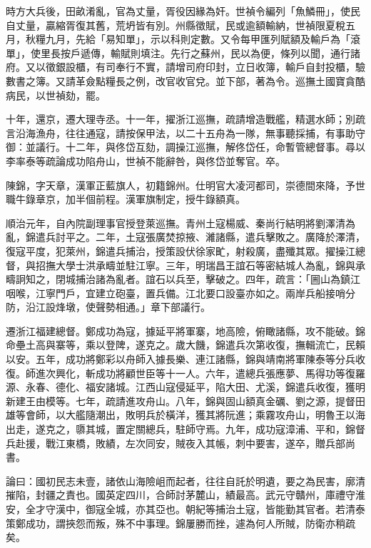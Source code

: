 \begin{pinyinscope}
時方大兵後，田畝淆亂，官為丈量，胥役因緣為奸。世禎令編列「魚鱗冊」，使民自丈量，贏縮胥復其舊，荒坍皆有別。州縣徵賦，民或逾額輸納，世禎限夏稅五月，秋糧九月，先給「易知單」，示以科則定數。又令每甲匯列賦額及輸戶為「滾單」，使里長按戶遞傳，輸賦則填注。先行之蘇州，民以為便，條列以聞，通行諸府。又以徵銀設櫃，有司奉行不實，請增司府印封，立日收簿，輸戶自封投櫃，驗數書之簿。又請革僉點糧長之例，改官收官兌。並下部，著為令。巡撫土國寶貪酷病民，以世禎劾，罷。

十年，還京，遷大理寺丞。十一年，擢浙江巡撫，疏請增造戰艦，精選水師；別疏言沿海漁舟，往往通寇，請按保甲法，以二十五舟為一隊，無事聽採捕，有事助守御：並議行。十二年，與佟岱互劾，調操江巡撫，解佟岱任，命暫管總督事。尋以李率泰等疏論成功陷舟山，世禎不能辭咎，與佟岱並奪官。卒。

陳錦，字天章，漢軍正藍旗人，初籍錦州。仕明官大凌河都司，崇德間來降，予世職牛錄章京，加半個前程。漢軍旗制定，授牛錄額真。

順治元年，自內院副理事官授登萊巡撫。青州土寇楊威、秦尚行結明將劉澤清為亂，錦遣兵討平之。二年，土寇張廣焚掠掖、濰諸縣，遣兵擊敗之。廣降於澤清，復寇平度，犯萊州，錦遣兵捕治，授策設伏徐家甿，射殺廣，盡殲其眾。擢操江總督，與招撫大學士洪承疇並駐江寧。三年，明瑞昌王誼石等密結城人為亂，錦與承疇詗知之，閉城捕治諸為亂者。誼石以兵至，擊破之。四年，疏言：「圌山為鎮江咽喉，江寧門戶，宜建立砲臺，置兵備。江北要口設臺亦如之。兩岸兵船接哨分防，沿江設烽墩，使聲勢相通。」章下部議行。

遷浙江福建總督。鄭成功為寇，據延平將軍寨，地高險，俯瞰諸縣，攻不能破。錦命壘土高與寨等，乘以登陴，遂克之。歲大饑，錦遣兵次第收復，撫輯流亡，民賴以安。五年，成功將鄭彩以舟師入據長樂、連江諸縣，錦與靖南將軍陳泰等分兵收復。師進次興化，斬成功將顧世臣等十一人。六年，遣總兵張應夢、馬得功等復羅源、永春、德化、福安諸城。江西山寇侵延平，陷大田、尤溪，錦遣兵收復，獲明新建王由模等。七年，疏請進攻舟山。八年，錦與固山額真金礪、劉之源，提督田雄等會師，以大艦隨潮出，敗明兵於橫洋，獲其將阮進；乘霧攻舟山，明魯王以海出走，遂克之，隳其城，置定關總兵，駐師守焉。九年，成功寇漳浦、平和，錦督兵赴援，戰江東橋，敗績，左次同安，賊夜入其帳，刺中要害，遂卒，贈兵部尚書。

論曰：國初民志未壹，諸依山海險岨而起者，往往自託於明遺，要之為民害，廓清摧陷，封疆之責也。國英定四川，合師討茅麓山，績最高。武元守贛州，庫禮守淮安，全才守漢中，御寇全城，亦其亞也。朝紀等捕治土寇，皆能勤其官者。若清泰策鄭成功，謂挾怨而叛，殊不中事理。錦屢勝而挫，遽為何人所賊，防衛亦稍疏矣。


\end{pinyinscope}
